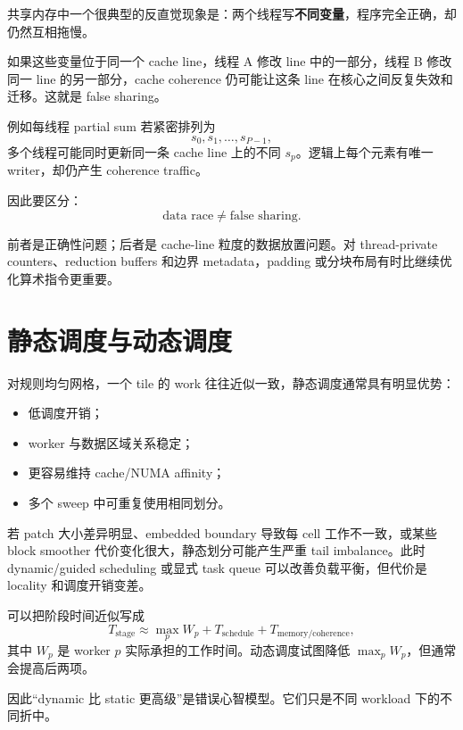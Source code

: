 共享内存中一个很典型的反直觉现象是：两个线程写\textbf{不同变量}，程序完全正确，却仍然互相拖慢。

如果这些变量位于同一个 cache line，线程 A 修改 line 中的一部分，线程 B 修改同一 line 的另一部分，cache coherence 仍可能让这条 line 在核心之间反复失效和迁移。这就是 false sharing。

例如每线程 partial sum 若紧密排列为
\begin{equation}
s_0,s_1,\ldots,s_{P-1},
\end{equation}
多个线程可能同时更新同一条 cache line 上的不同 $s_p$。逻辑上每个元素有唯一 writer，却仍产生 coherence traffic。

因此要区分：
\begin{equation}
\boxed{
\text{data race}
\neq
\text{false sharing}.
}
\end{equation}

前者是正确性问题；后者是 cache-line 粒度的数据放置问题。对 thread-private counters、reduction buffers 和边界 metadata，padding 或分块布局有时比继续优化算术指令更重要。

\section{静态调度与动态调度}

对规则均匀网格，一个 tile 的 work 往往近似一致，静态调度通常具有明显优势：
\begin{itemize}
\item 低调度开销；
\item worker 与数据区域关系稳定；
\item 更容易维持 cache/NUMA affinity；
\item 多个 sweep 中可重复使用相同划分。
\end{itemize}

若 patch 大小差异明显、embedded boundary 导致每 cell 工作不一致，或某些 block smoother 代价变化很大，静态划分可能产生严重 tail imbalance。此时 dynamic/guided scheduling 或显式 task queue 可以改善负载平衡，但代价是 locality 和调度开销变差。

可以把阶段时间近似写成
\begin{equation}
T_{\mathrm{stage}}
\approx
\max_p W_p
+
T_{\mathrm{schedule}}
+
T_{\mathrm{memory/coherence}},
\end{equation}
其中 $W_p$ 是 worker $p$ 实际承担的工作时间。动态调度试图降低 $\max_p W_p$，但通常会提高后两项。

因此“dynamic 比 static 更高级”是错误心智模型。它们只是不同 workload 下的不同折中。

